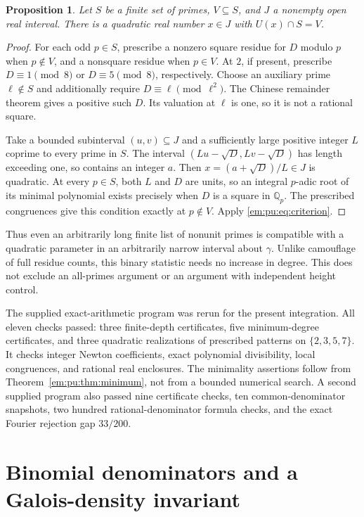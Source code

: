 \documentclass[11pt,a4paper]{article}
\newcommand{\Q}{\mathbb Q}
\newtheorem{proposition}[theorem]{Proposition}
\theoremstyle{definition}
\theoremstyle{remark}
\theoremstyle{plain}
\numberwithin{equation}{section}
\begin{document}
\begin{proposition}\label{em:pu:prop:camouflage}
Let $S$ be a finite set of primes, $V\subseteq S$, and $J$ a
nonempty open real interval.  There is a quadratic real number
$x\in J$ with $U(x)\cap S=V$.
\end{proposition}
\begin{proof}
For each odd $p\in S$, prescribe a nonzero square residue for $D$
modulo $p$ when $p\notin V$, and a nonsquare residue when
$p\in V$.  At $2$, if present, prescribe $D\equiv1\pmod8$
or $D\equiv5\pmod8$, respectively.  Choose an auxiliary prime
$\ell\notin S$ and additionally require $D\equiv\ell\pmod{\ell^2}$.
The Chinese remainder theorem gives a positive such $D$.
Its valuation at $\ell$ is one, so it is not a rational square.

Take a bounded subinterval $(u,v)\subseteq J$ and a sufficiently
large positive integer $L$ coprime to every prime in $S$.
The interval $(Lu-\sqrt D,Lv-\sqrt D)$ has length exceeding one,
so contains an integer $a$.  Then
$x=(a+\sqrt D)/L\in J$ is quadratic.
At every $p\in S$, both $L$ and $D$ are units, so an integral
$p$-adic root of its minimal polynomial exists precisely when
$D$ is a square in $\Q_p$.  The prescribed congruences give this
condition exactly at $p\notin V$.  Apply \eqref{em:pu:eq:criterion}.
\end{proof}

Thus even an arbitrarily long finite list of nonunit primes is
compatible with a quadratic parameter in an arbitrarily narrow
interval about $\gamma$.  Unlike camouflage of full residue
counts, this binary statistic needs no increase in degree.
This does not exclude an all-primes argument or an argument with
independent height control.

The supplied exact-arithmetic program was rerun for the present integration.
All eleven checks passed: three finite-depth certificates, five
minimum-degree certificates, and three quadratic realizations of prescribed
patterns on $\{2,3,5,7\}$. It checks integer Newton coefficients,
exact polynomial divisibility, local congruences, and rational real
enclosures. The minimality assertions follow from
Theorem~\ref{em:pu:thm:minimum}, not from a bounded numerical search.
A second supplied program also passed nine certificate checks, ten
common-denominator snapshots, two hundred rational-denominator formula
checks, and the exact Fourier rejection gap $33/200$.

\section{Binomial denominators and a Galois-density invariant}
\label{em:sec:binomial-denominators}
\end{document}
